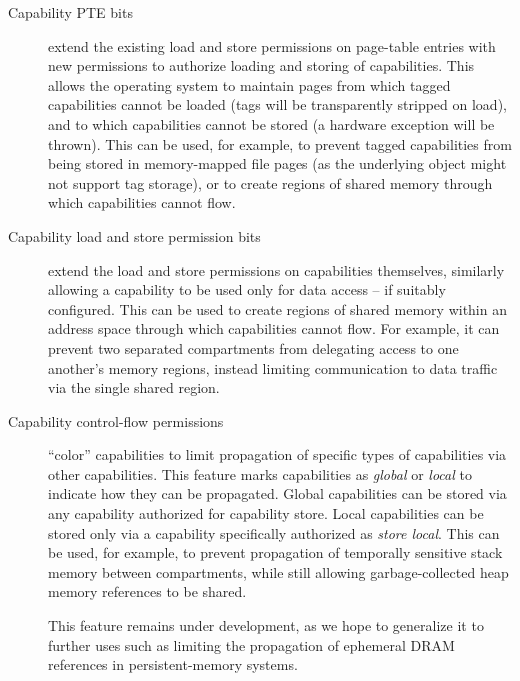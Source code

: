 \begin{description}

\item[Capability PTE bits] extend the existing load and store
  permissions on page-table entries with new permissions to authorize loading and storing
  of capabilities.
  This allows the operating system to maintain pages from which tagged
  capabilities cannot be loaded (tags will be transparently stripped on load),
  and to which capabilities cannot be stored (a hardware exception will be
  thrown).
  This can be used, for example, to prevent tagged capabilities from being
  stored in memory-mapped file pages (as the underlying object might not
  support tag storage), or to create regions of shared memory through which
  capabilities cannot flow.

\item[Capability load and store permission bits] extend the load and store
  permissions on capabilities themselves, similarly allowing a capability to
  be used only for data access -- if suitably configured.
  This can be used to create regions of shared memory within an address
  space through which capabilities cannot flow.
  For example, it can 
prevent
  two separated compartments from
  delegating access to one another's memory regions, instead limiting
  communication to data traffic via the single shared region.

\item[Capability control-flow permissions] ``color'' capabilities to limit
  propagation of specific types of capabilities via other capabilities.
  This feature marks capabilities as \textit{global} or \textit{local} to
  indicate how they can be propagated.
  Global capabilities can be stored via any capability authorized for
  capability store.
  Local capabilities can be stored only via a capability specifically
  authorized as \textit{store local}.
  This can be used, for example, to prevent propagation of temporally
  sensitive stack memory between compartments, while still allowing
  garbage-collected heap memory references to be shared.

  This feature remains under development, as we hope to generalize it to
  further uses such as limiting the propagation of ephemeral DRAM references
  in persistent-memory systems.

\end{description}


